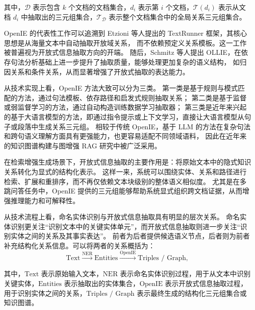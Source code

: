 \noindent 其中，$\mathcal{D}$ 表示包含 $k$ 个文档的文档集合，$d_i$ 表示第 $i$ 个文档，$\mathcal{T}(d_i)$ 表示从文档 $d_i$ 中抽取出的三元组集合，$\mathcal{T}_{\mathcal{D}}$ 表示整个文档集合中的全局关系三元组集合。

OpenIE 的代表性工作可以追溯到 Etzioni\cite{openie} 等人提出的 TextRunner 框架，其核心思想是从海量文本中自动抽取开放域关系，
而不依赖预定义关系模板。这一工作被普遍视为开放式信息抽取方向的开端。
随后，Schmitz\cite{schmitz2012open} 等人提出 OLLIE，在依存句法分析基础上进一步提升了抽取质量，能够处理更加复杂的语义结构，
如归因关系和条件关系，从而显著增强了开放式抽取的表达能力。


从技术实现上看，OpenIE 方法大致可以分为三类。
第一类是基于规则与模式匹配的方法，通过句法模板、依存路径和启发式规则抽取关系；
第二类是基于监督或弱监督学习的方法，通过自动构造训练数据学习抽取器；
第三类是近年来兴起的基于大语言模型的方法，即通过指令提示或上下文学习，直接让大语言模型从句子或段落中生成关系三元组。
相较于传统 OpenIE，基于 LLM 的方法在复杂句法和跨句语义理解方面具有更强能力，也更容易适配不同领域语料，
因此在近年来的知识图谱构建与图增强 RAG 研究中被广泛采用。

在检索增强生成场景下，开放式信息抽取的主要作用是：将原始文本中的隐式知识关系转化为显式的结构化表示。
这样一来，系统可以围绕实体、关系和路径进行检索、扩展和重排序，而不再仅依赖文本块级别的整体语义相似度。
尤其是在多跳问答任务中，OpenIE 提供的三元组能够帮助系统显式组织跨文档证据，从而增强推理能力和可解释性。

从技术流程上看，命名实体识别与开放式信息抽取具有明显的层次关系。
命名实体识别更关注“识别文本中的关键实体单元”，而开放式信息抽取则进一步关注“识别实体之间的关系及其事实表达”。
前者为后者提供候选语义节点，后者则为前者补充结构化关系信息。可以将两者的关系概括为：
\begin{equation}
\text{Text} \xrightarrow{\text{NER}} \text{Entities} \xrightarrow{\text{OpenIE}} \text{Triples / Graph},
\end{equation}

\noindent 其中，$\text{Text}$ 表示原始输入文本，$\text{NER}$ 表示命名实体识别过程，用于从文本中识别关键实体，$\text{Entities}$ 表示抽取出的实体集合，$\text{OpenIE}$ 表示开放式信息抽取过程，用于识别实体之间的关系，$\text{Triples / Graph}$ 表示最终生成的结构化三元组集合或知识图谱。

